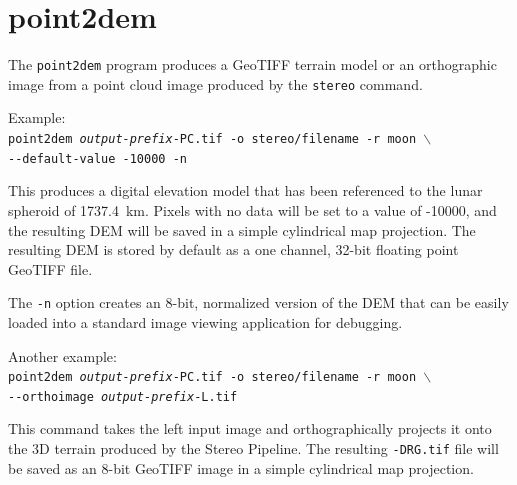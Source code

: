 
\section{point2dem}
\label{point2dem}

The \texttt{point2dem} program produces a GeoTIFF terrain model or an orthographic image from a point cloud image produced by the {\tt stereo} command.

Example:\\
\hspace*{2em}\texttt{point2dem \textit{output-prefix}-PC.tif -o stereo/filename -r moon $\backslash$} \\
\hspace*{4em}\texttt{-\/-default-value -10000 -n}

This produces a digital elevation model that has been referenced to
the lunar spheroid of 1737.4~km.  Pixels with no data will be set to a
value of -10000, and the resulting \ac{DEM} will be saved in a simple
cylindrical map projection.  The resulting \ac{DEM} is stored by default as
a one channel, 32-bit floating point GeoTIFF file.

The {\tt -n} option creates an 8-bit, normalized version of the DEM
that can be easily loaded into a standard image viewing application
for debugging.

Another example: \\
\hspace*{2em}\texttt{point2dem \textit{output-prefix}-PC.tif -o stereo/filename -r moon $\backslash$} \\
\hspace*{4em}\texttt{-\/-orthoimage \textit{output-prefix}-L.tif}

This command takes the left input image and orthographically projects
it onto the 3D terrain produced by the Stereo Pipeline.  The resulting
{\tt *-DRG.tif} file will be saved as an 8-bit GeoTIFF image in a
simple cylindrical map projection.

